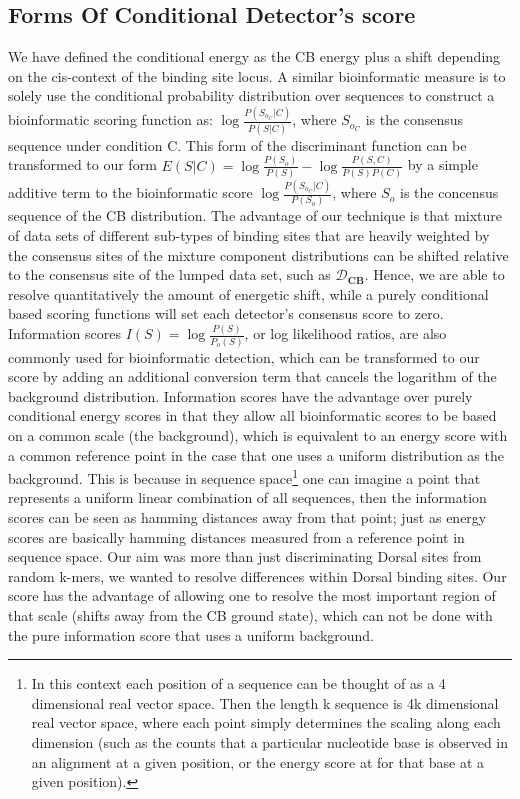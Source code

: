 \subsection{Forms Of Conditional Detector's score}
We have defined the conditional energy as the CB energy plus a shift depending on the cis-context of the binding site locus.  A similar bioinformatic measure is to solely use the conditional probability distribution over sequences to construct a bioinformatic scoring function as: $\log{\frac{P(S_{o_C}|C)}{P(S|C)}}$, where $S_{o_C}$ is the consensus sequence under condition C.  This form of the discriminant function can be transformed to our form $E(S|C)=\log{\frac{P(S_o)}{P(S)}} - \log{\frac{P(S,C)}{P(S)P(C)}}$ by a simple additive term to the bioinformatic score $\log{ \frac{P(S_{o_C}|C)}{P(S_o)}}$, where $S_o$ is the concensus sequence of the CB distribution.  The advantage of our technique is that mixture of data sets of different sub-types of binding sites that are heavily weighted by the consensus sites of the mixture component distributions can be shifted relative to the consensus site of the lumped data set, such as $\mathcal D_{\textbf{CB}}$.  Hence, we are able to resolve quantitatively the amount of energetic shift, while a purely conditional based scoring functions will set each detector's consensus score to zero.  Information scores $I(S)=\log{\frac{P(S)}{P_o(S)}}$, or log likelihood ratios, are also commonly used for bioinformatic detection, which can be transformed to our score by adding an additional conversion term that cancels the logarithm of the background distribution.  Information scores have the advantage over purely conditional energy scores in that they allow all bioinformatic scores to be based on a common scale (the background), which is equivalent to an energy score with a common reference point in the case that one uses a uniform distribution as the background.  This is because in sequence space\footnote{In this context each position of a sequence can be thought of as a 4 dimensional real vector space.  Then the length k sequence is 4k dimensional real vector space, where each point simply determines the scaling along each dimension (such as the counts that a particular nucleotide base is observed in an alignment at a given position, or the energy score at for that base at a given position).} one can imagine a point that represents a uniform linear combination of all sequences, then the information scores can be seen as hamming distances away from that point; just as energy scores are basically hamming distances measured from a reference point in sequence space.  Our aim was more than just discriminating Dorsal sites from random k-mers, we wanted to resolve differences within Dorsal binding sites.  Our score has the advantage of allowing one to resolve the most important region of that scale (shifts away from the CB ground state), which can not be done with the pure information score that uses a uniform background.
